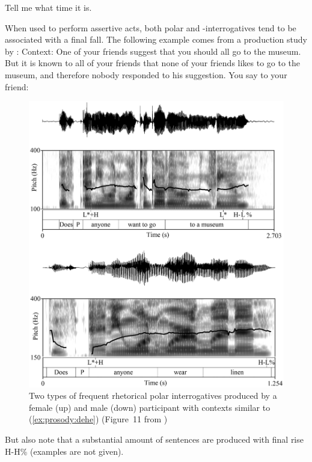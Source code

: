 Tell me what time it is.
\eex

When used to perform assertive acts, both polar and \twh-interrogatives tend to be associated with a final fall. The following example comes from a production study by \textcite{dehe2020rhetoric}:
Context: One of your friends suggest that you should all go to the museum. But it is known to all of your friends that none of your friends likes to go to the museum, and therefore nobody responded to his suggestion. You say to your friend: 
\eex
\begin{figure}[H]
\begin{center}
\includegraphics[width = 1\textwidth]{figures/rhe-polar.jpg}
	\caption{Two types of frequent rhetorical polar interrogatives produced by a female (up) and male (down) participant with contexts similar to (\ref{ex:prosody:dehe}) (Figure~11 from \cite{dehe2020rhetoric}) }\label{fig:rhe-polar}
\end{center}
\end{figure}

But \textcite{dehe2020rhetoric} also note that a substantial amount of sentences are produced with final rise H-H\% (examples are not given). 

